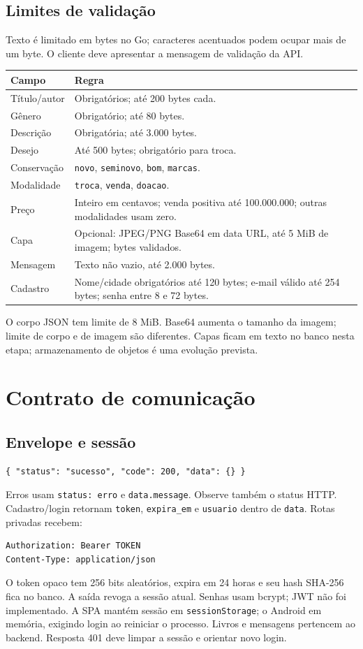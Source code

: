 \documentclass[11pt,a4paper]{article}
\begin{document}
\subsection{Limites de validação}
Texto é limitado em bytes no Go; caracteres acentuados podem ocupar mais de um byte. O cliente deve apresentar a mensagem de validação da API.
\par\medskip\noindent\begin{tabularx}{\textwidth}{@{}p{36mm}Y@{}}\toprule Campo & Regra\\\midrule
Título/autor & Obrigatórios; até 200 bytes cada.\\
Gênero & Obrigatório; até 80 bytes.\\
Descrição & Obrigatória; até 3.000 bytes.\\
Desejo & Até 500 bytes; obrigatório para troca.\\
Conservação & \texttt{novo}, \texttt{seminovo}, \texttt{bom}, \texttt{marcas}.\\
Modalidade & \texttt{troca}, \texttt{venda}, \texttt{doacao}.\\
Preço & Inteiro em centavos; venda positiva até 100.000.000; outras modalidades usam zero.\\
Capa & Opcional: JPEG/PNG Base64 em data URL, até 5 MiB de imagem; bytes validados.\\
Mensagem & Texto não vazio, até 2.000 bytes.\\
Cadastro & Nome/cidade obrigatórios até 120 bytes; e-mail válido até 254 bytes; senha entre 8 e 72 bytes.\\\bottomrule\end{tabularx}\par\medskip
O corpo JSON tem limite de 8 MiB. Base64 aumenta o tamanho da imagem; limite de corpo e de imagem são diferentes. Capas ficam em texto no banco nesta etapa; armazenamento de objetos é uma evolução prevista.
\section{Contrato de comunicação}
\subsection{Envelope e sessão}
\begin{lstlisting}
{ "status": "sucesso", "code": 200, "data": {} }
\end{lstlisting}
Erros usam \texttt{status: erro} e \texttt{data.message}. Observe também o status HTTP. Cadastro/login retornam \texttt{token}, \texttt{expira\_em} e \texttt{usuario} dentro de \texttt{data}. Rotas privadas recebem:
\begin{lstlisting}
Authorization: Bearer TOKEN
Content-Type: application/json
\end{lstlisting}
O token opaco tem 256 bits aleatórios, expira em 24 horas e seu hash SHA-256 fica no banco. A saída revoga a sessão atual. Senhas usam bcrypt; JWT não foi implementado.
A SPA mantém sessão em \texttt{sessionStorage}; o Android em memória, exigindo login ao reiniciar o processo. Livros e mensagens pertencem ao backend. Resposta 401 deve limpar a sessão e orientar novo login.
\end{document}
